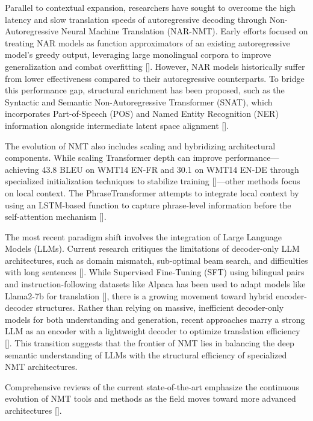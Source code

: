 \documentclass[11pt]{article}
\begin{document}
Parallel to contextual expansion, researchers have sought to overcome the high latency and slow translation speeds of autoregressive decoding through Non-Autoregressive Neural Machine Translation (NAR-NMT). Early efforts focused on treating NAR models as function approximators of an existing autoregressive model's greedy output, leveraging large monolingual corpora to improve generalization and combat overfitting [\citep{2005.00932}]. However, NAR models historically suffer from lower effectiveness compared to their autoregressive counterparts. To bridge this performance gap, structural enrichment has been proposed, such as the Syntactic and Semantic Non-Autoregressive Transformer (SNAT), which incorporates Part-of-Speech (POS) and Named Entity Recognition (NER) information alongside intermediate latent space alignment [\citep{2101.08942}].

The evolution of NMT also includes scaling and hybridizing architectural components. While scaling Transformer depth can improve performance—achieving 43.8 BLEU on WMT14 EN-FR and 30.1 on WMT14 EN-DE through specialized initialization techniques to stabilize training [\citep{2008.07772}]—other methods focus on local context. The PhraseTransformer attempts to integrate local context by using an LSTM-based function to capture phrase-level information before the self-attention mechanism [\citep{2308.10482}].

The most recent paradigm shift involves the integration of Large Language Models (LLMs). Current research critiques the limitations of decoder-only LLM architectures, such as domain mismatch, sub-optimal beam search, and difficulties with long sentences [\citep{2401.08350}]. While Supervised Fine-Tuning (SFT) using bilingual pairs and instruction-following datasets like Alpaca has been used to adapt models like Llama2-7b for translation [\citep{2401.08350}], there is a growing movement toward hybrid encoder-decoder structures. Rather than relying on massive, inefficient decoder-only models for both understanding and generation, recent approaches marry a strong LLM as an encoder with a lightweight decoder to optimize translation efficiency [\citep{2503.06594}]. This transition suggests that the frontier of NMT lies in balancing the deep semantic understanding of LLMs with the structural efficiency of specialized NMT architectures.

Comprehensive reviews of the current state-of-the-art emphasize the continuous evolution of NMT tools and methods as the field moves toward more advanced architectures [\citep{2012.15515}].
\end{document}
